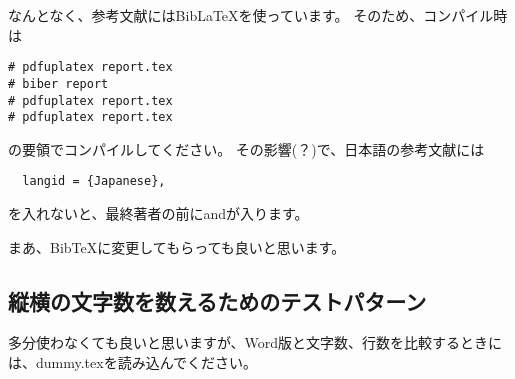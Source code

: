 \documentclass[uplatex,dvipdfmx,11pt]{jsarticle}
\begin{document}
なんとなく、参考文献にはBibLaTeXを使っています。
そのため、コンパイル時は
\begin{verbatim}
# pdfuplatex report.tex
# biber report
# pdfuplatex report.tex
# pdfuplatex report.tex
\end{verbatim}
の要領でコンパイルしてください。
その影響(？)で、日本語の参考文献には
\begin{verbatim}
  langid = {Japanese},
\end{verbatim}
を入れないと、最終著者の前にandが入ります。

まあ、BibTeXに変更してもらっても良いと思います。


\subsection{縦横の文字数を数えるためのテストパターン}
多分使わなくても良いと思いますが、Word版と文字数、行数を比較するときには、dummy.texを読み込んでください。

\printbibliography[title=参考文献]
\end{document}
